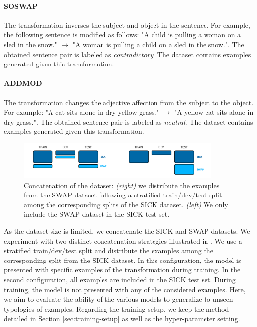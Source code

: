 \paragraph{SOSWAP} The transformation inverses the subject and object in the sentence. For example, the following sentence is modified as follows: "A child is pulling  a woman on a sled in the snow." $\rightarrow$ "A woman is pulling a child on a sled in the snow.". The obtained sentence pair is labeled as \textit{contradictory}. The dataset contains  examples generated given this transformation.

\paragraph{ADDMOD}  The transformation changes the adjective affection from the subject to the object. For example: "A cat sits  alone in dry yellow grass." $\rightarrow$ "A yellow cat sits alone in dry grass.". The obtained sentence pair is labeled as \textit{neutral}. The dataset contains  examples generated given this transformation.

\begin{figure}[!htb]
\begin{center}
\includegraphics[width=10cm]{images/swap-split.png}
\end{center}
\caption{Concatenation of the dataset: \textit{(right)} we distribute the examples from the SWAP dataset following a stratified train/dev/test split among the corresponding splits of the SICK dataset. \textit{(left)} We only include the SWAP dataset in the SICK test set.}
\end{figure}

As the dataset size is limited, we concatenate the SICK and SWAP datasets. We experiment with two distinct concatenation strategies illustrated in . We use a stratified train/dev/test split and distribute the examples among the corresponding split from the SICK dataset. In this configuration, the model is presented with specific examples of the transformation during training. In the second configuration, all examples are included in the SICK test set. During training, the model is not presented with any of the considered examples. Here, we aim to evaluate the ability of the various models to generalize to unseen typologies of examples. Regarding the training setup, we keep the method detailed in Section \ref{sec:training-setup} as well as the hyper-parameter setting.

